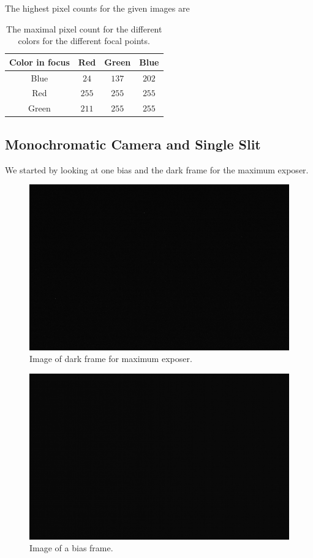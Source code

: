 \documentclass{emulateapj}
\begin{document}
The highest pixel counts for the given images are

\begin{table}[H]
\centering
\begin{tabular}{c | c | c | c}
Color in focus & Red & Green & Blue \\
\hline
Blue & $24$ & $137$ & $202$\\
Red & $255$ & $255$ & $255$\\
Green & $211$ & $255$ & $255$
\end{tabular}
\caption{The maximal pixel count for the different colors for the different focal points.}
\end{table}




\subsection{Monochromatic Camera and Single Slit}

We started by looking at one bias and the dark frame for the maximum exposer.

\begin{figure}[H]
\centering
\includegraphics[scale=0.2]{df_max_exp.png}
\caption{Image of dark frame for maximum exposer.}
\label{img:df_max}
\end{figure}

\begin{figure}[H]
\centering
\includegraphics[scale=0.2]{bf1.png}
\caption{Image of a bias frame.}
\label{img:bf1}
\end{figure}
\end{document}
